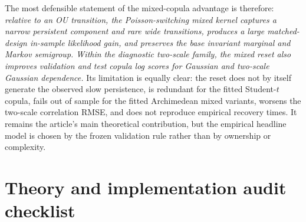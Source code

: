 \documentclass[11pt]{article}
\newcommand{\1}{\mathbf{1}}
\begin{document}
The most defensible statement of the mixed-copula advantage is therefore:
\emph{relative to an OU transition, the Poisson-switching mixed kernel captures a
narrow persistent component and rare wide transitions, produces a large matched-
design in-sample likelihood gain, and preserves the base invariant marginal and
Markov semigroup.  Within the diagnostic two-scale family, the mixed reset also
improves validation and test copula log scores for Gaussian and two-scale
Gaussian dependence.}  Its limitation is equally clear: the reset does not by
itself generate the observed slow persistence, is redundant for the fitted
Student-$t$ copula, fails out of sample for the fitted Archimedean mixed variants,
worsens the two-scale correlation RMSE, and does not reproduce empirical
recovery times.  It remains the article's main theoretical contribution, but the
empirical headline model is chosen by the frozen validation rule rather than by
ownership or complexity.

\appendix
\section{Theory and implementation audit checklist}
\label{emp:app:audit}
\end{document}
